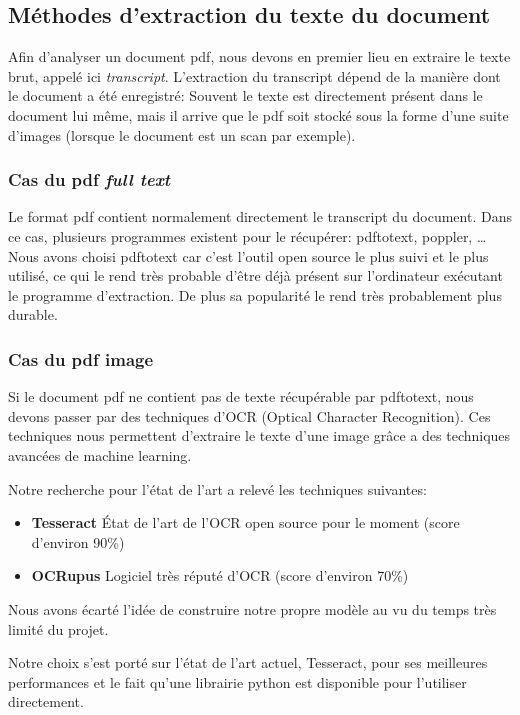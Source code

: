 

\subsection{Méthodes d'extraction du texte du document}
Afin d'analyser un document pdf, nous devons en premier lieu en extraire le texte brut, appelé ici \textit{transcript}.
L'extraction du transcript dépend de la manière dont le document a été enregistré: Souvent le texte est directement présent dans le document lui même, mais il arrive que le pdf soit stocké sous la forme d'une suite d'images (lorsque le document est un scan par exemple).

\subsubsection{Cas du pdf \textit{full text}}
Le format pdf contient normalement directement le transcript du document.
Dans ce cas, plusieurs programmes existent pour le récupérer: pdftotext, poppler, \ldots 
Nous avons choisi pdftotext car c'est l'outil open source le plus suivi et le plus utilisé, ce qui le rend très probable d'être déjà présent sur l'ordinateur exécutant le programme d'extraction.
De plus sa popularité le rend très probablement plus durable.

\subsubsection{Cas du pdf image}
Si le document pdf ne contient pas de texte récupérable par pdftotext, nous devons passer par des techniques d'OCR (Optical Character Recognition).
Ces techniques nous permettent d'extraire le texte d'une image grâce a des techniques avancées de machine learning.

Notre recherche pour l'état de l'art a relevé les techniques suivantes:
\begin{itemize}
\item \textbf{Tesseract}
État de l'art de l'OCR open source pour le moment (score d'environ 90\%)
\item \textbf{OCRupus}
Logiciel très réputé d'OCR (score d'environ 70\%)
\end{itemize}
Nous avons écarté l'idée de construire notre propre modèle au vu du temps très limité du projet.

Notre choix s'est porté sur l'état de l'art actuel, Tesseract, pour ses meilleures performances et le fait qu'une librairie python est disponible pour l'utiliser directement.

